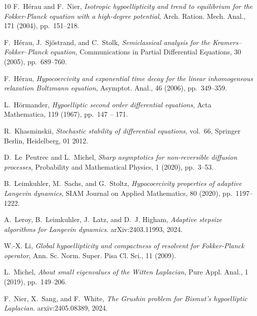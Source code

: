 \documentclass[12pt]{amsart}
\numberwithin{equation}{section}
\numberwithin{figure}{section}
\begin{document}
\begin{thebibliography}{10}
{\sc F.~H\'erau and F.~Nier}, {\em Isotropic hypoellipticity and trend to equilibrium for the {F}okker-{P}lanck equation with a high-degree potential}, Arch. Ration. %
Mech. Anal., 171 (2004), pp.~151--218. %

{\sc F.~H\'erau, J.~Sj\"ostrand, and C.~Stolk}, {\em Semiclassical analysis for the {K}ramers–{F}okker–{P}lanck equation}, Communications in Partial Differential Equations, 30 (2005), pp.~689--760.

{\sc F.~Hérau}, {\em Hypocoercivity and exponential time decay for the linear inhomogeneous relaxation {B}oltzmann equation}, Asymptot. Anal., 46 (2006), pp.~349--359.

{\sc L.~Hörmander}, {\em {Hypoelliptic second order differential equations}}, Acta Mathematica, 119 (1967), pp.~147 -- 171.

{\sc R.~Khasminskii}, {\em Stochastic stability of differential equations}, vol.~66, Springer Berlin, Heidelberg, 01 2012.

{\sc D.~Le~Peutrec and L.~Michel}, {\em Sharp asymptotics for non-reversible diffusion processes}, Probability and Mathematical Physics, 1 (2020), pp.~3--53.

{\sc B.~Leimkuhler, M.~Sachs, and G.~Stoltz}, {\em Hypocoercivity properties of adaptive {L}angevin dynamics}, {SIAM Journal on Applied Mathematics}, 80 (2020), pp.~1197--1222.

{\sc A.~Leroy, B.~Leimkuhler, J.~Latz, and D.~J. Higham}, {\em Adaptive stepsize algorithms for {L}angevin dynamics}.
\newblock arXiv:2403.11993, 2024.

{\sc W.-X. Li}, {\em Global hypoellipticity and compactness of resolvent for {F}okker-{P}lanck operator}, Ann. Sc. Norm. Super. Pisa Cl. Sci., 11 (2009).

{\sc L.~Michel}, {\em {A}bout small eigenvalues of the {W}itten {L}aplacian}, Pure Appl. Anal., 1 (2019), pp.~149--206.

{\sc F.~Nier, X.~Sang, and F.~White}, {\em The {G}rushin problem for {B}ismut's hypoelliptic {L}aplacian}.
\newblock arxiv:2405.08389, 2024.


\end{thebibliography}
\end{document}
